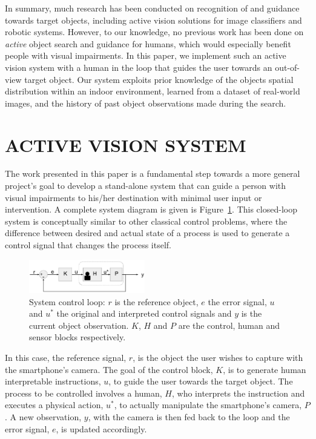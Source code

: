 \documentclass[a4paper, twoside]{article}
\begin{document}
In summary, much research has been conducted on recognition of and guidance towards target objects, including active vision solutions for image classifiers and robotic systems. However, to our knowledge, no previous work has been done on {\em active} object search and guidance for humans, which would especially benefit people with visual impairments. In this paper, we implement such an active vision system with a human in the loop
that guides the user towards an out-of-view target object. Our system exploits prior knowledge of the objects spatial distribution within an indoor environment, learned from a dataset of real-world images, and the history of past object observations made during the search.

\section{\uppercase{Active Vision System}}\label{sec:system-design}

\noindent The work presented in this paper is a fundamental step towards a more general project's goal to develop a stand-alone system that can guide a person with visual impairments to his/her destination with minimal user input or intervention. A complete system diagram is given is Figure~\ref{fig:control-loop}. This closed-loop system is conceptually similar to other classical control problems, where the difference between desired and actual state of a process is used to generate a control signal that changes the process itself.

\begin{figure}
  \centering
  \includegraphics[width=0.45\textwidth]{../figures/control_loop.png}
  \caption{System control loop: $r$ is the reference object, $e$ the error signal, $u$ and $u^*$ the original and interpreted control signals and $y$ is the current object observation. $K$, $H$ and $P$ are the control, human and sensor blocks respectively. }\label{fig:control-loop}
\end{figure}

In this case, the reference signal, $r$, is the object the user wishes to capture with the smartphone's camera. The goal of the control block, $K$, is to generate human interpretable instructions, $u$, to guide the user towards the target object. The process to be controlled involves a human, $H$, who interprets the instruction and executes a physical action, $u^*$, to actually manipulate the smartphone's camera, $P$. A new observation, $y$, with the camera is then fed back to the loop and the error signal, $e$, is updated accordingly.  
\end{document}
